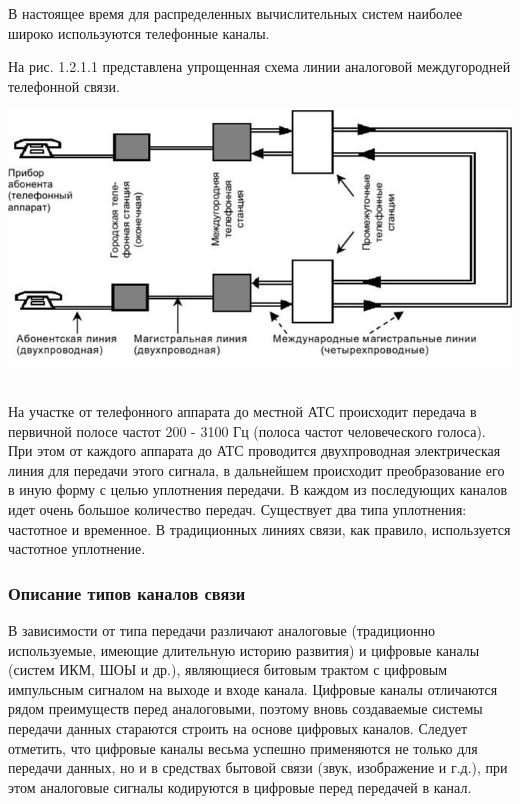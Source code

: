 \documentclass[a4paper]{report}
\begin{document}
В настоящее время для распределенных вычислительных систем наиболее широко используются телефонные каналы.

На рис. 1.2.1.1 представлена упрощенная схема линии аналоговой междугородней телефонной связи.

\includegraphics[scale=1.4]{66}
{\\}
~

На участке от телефонного аппарата до местной АТС происходит передача в первичной полосе частот 200 - 3100 Гц (полоса частот человеческого голоса). При этом от каждого аппарата до АТС проводится двухпроводная электрическая линия для передачи этого сигнала, в дальнейшем происходит преобразование его в иную форму с целью уплотнения передачи. В каждом из последующих каналов идет очень большое количество передач. Существует два типа уплотнения: частотное и временное. В традиционных линиях связи, как правило, используется частотное уплотнение.

\subsubsection{Описание типов каналов связи}

В зависимости от типа передачи различают аналоговые (традиционно используемые, имеющие длительную историю развития) и цифровые каналы (систем ИКМ, ШОЫ и др.), являющиеся битовым трактом с цифровым импульсным сигналом на выходе и входе канала. Цифровые каналы отличаются рядом преимуществ перед аналоговыми, поэтому вновь создаваемые системы передачи данных стараются строить на основе цифровых каналов. Следует отметить, что цифровые каналы весьма успешно применяются не только для передачи данных, но и в средствах бытовой связи (звук, изображение и г.д.), при этом аналоговые сигналы кодируются в цифровые перед передачей в канал.
\end{document}

